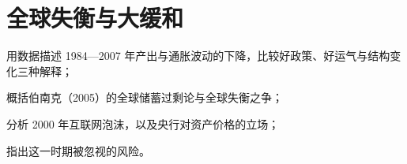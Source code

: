 \chapter{全球失衡与大缓和}\label{ch:moderation}

\begin{chapterguide}
\begin{guidegoals}
\item 用数据描述 1984—2007 年产出与通胀波动的下降，比较好政策、好运气与结构变化三种解释；
\item 概括伯南克（2005）的全球储蓄过剩论与全球失衡之争；
\item 分析 2000 年互联网泡沫，以及央行对资产价格的立场；
\item 指出这一时期被忽视的风险。
\end{guidegoals}
\end{chapterguide}

\chapterstub
